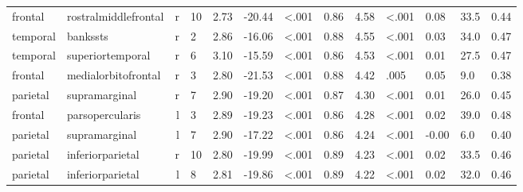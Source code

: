 \documentclass{article}
\begin{document}
\begin{longtable}{llrR{1.5cm}R{1cm}R{1.3cm}R{1cm}R{1cm}R{1.3cm}R{1cm}R{1.8cm}R{1.3cm}R{1.8cm}}
   frontal &      rostralmiddlefrontal &    r &           10 &                  2.73 &           -20.44 &      \textless.001 &                               0.86 &                          4.58 &                   \textless.001 &  0.08 &   33.5 &      0.44 \\
  temporal &                  bankssts &    r &            2 &                  2.86 &           -16.06 &      \textless.001 &                               0.88 &                          4.55 &                   \textless.001 &  0.03 &   34.0 &      0.47 \\
  temporal &          superiortemporal &    r &            6 &                  3.10 &           -15.59 &      \textless.001 &                               0.86 &                          4.53 &                   \textless.001 &  0.01 &   27.5 &      0.47 \\
   frontal &       medialorbitofrontal &    r &            3 &                  2.80 &           -21.53 &      \textless.001 &                               0.88 &                          4.42 &                            .005 &  0.05 &    9.0 &      0.38 \\
  parietal &             supramarginal &    r &            7 &                  2.90 &           -19.20 &      \textless.001 &                               0.87 &                          4.30 &                   \textless.001 &  0.01 &   26.0 &      0.45 \\
   frontal &           parsopercularis &    l &            3 &                  2.89 &           -19.23 &      \textless.001 &                               0.86 &                          4.28 &                   \textless.001 &  0.02 &   39.0 &      0.48 \\
  parietal &             supramarginal &    l &            7 &                  2.90 &           -17.22 &      \textless.001 &                               0.86 &                          4.24 &                   \textless.001 & -0.00 &    6.0 &      0.40 \\
  parietal &          inferiorparietal &    r &           10 &                  2.80 &           -19.99 &      \textless.001 &                               0.89 &                          4.23 &                   \textless.001 &  0.02 &   33.5 &      0.46 \\
  parietal &          inferiorparietal &    l &            8 &                  2.81 &           -19.86 &      \textless.001 &                               0.89 &                          4.22 &                   \textless.001 &  0.02 &   32.0 &      0.46 \\

\end{longtable}
\end{document}

